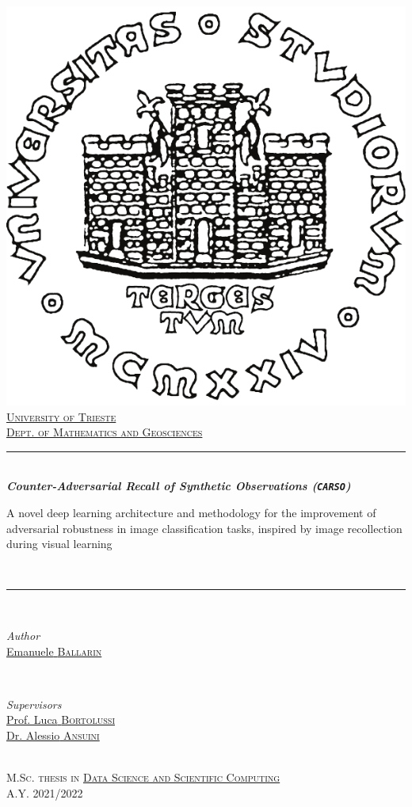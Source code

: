 
\begin{titlepage}

    \center

    \vspace*{0.4cm}

    \includegraphics[width=0.30\linewidth]{img/logounits.pdf}
    \\[0.9cm]
    \href{https://www.units.it/}{\textsc{\LARGE{University of Trieste}}}
    \\
    \href{https://dmg.units.it/}{\Large \textsc{Dept. of Mathematics and Geosciences}}
    \\[1.2cm]

    \rule{\linewidth}{0.5mm}
    \\[0.4cm]
    { \huge \bfseries \textit{Counter-Adversarial Recall of Synthetic Observations (\texttt{\textit{CARSO}})}}
    \\[0.4cm]
    \begin{minipage}{0.95\textwidth}
        { \LARGE A novel deep learning architecture and methodology for the improvement of adversarial robustness in image classification tasks, inspired by image recollection during visual learning}
    \end{minipage}
    \\[0.4cm]
    \rule{\linewidth}{0.5mm}
    \\[1.8cm]

    \begin{minipage}{0.4\textwidth}
        \begin{flushleft}
            \Large \emph{{Author}}
            \\
            \href{https://ballarin.cc/}{{Emanuele} \textsc{{Ballarin}}}
        \end{flushleft}
    \end{minipage}
    ~
    \begin{minipage}{0.4\textwidth}
        \begin{flushleft}
            \Large \emph{{Supervisors}}
            \\
            \href{https://aicps.units.it/}{{Prof. Luca} \textsc{{Bortolussi}}}
            \\
                \href{https://www.areasciencepark.it/i-nostri-campus/insediato/?id=ansuini}{{Dr. Alessio} \textsc{{Ansuini}}}
        \end{flushleft}
    \end{minipage}
    \\[2cm]

    \Large \textsc{M.Sc. thesis in \href{https://dssc.units.it/}{Data Science and Scientific Computing}
        \\
        A.Y. 2021/2022}
    \vfill

\end{titlepage}
